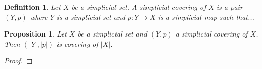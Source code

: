\documentclass{amsart}
\newtheorem{proposition}{Proposition}[section]
\newtheorem{definition}{Definition}[section]
\begin{document}
\begin{definition}
Let $X$ be a simplicial set. A simplicial covering of $X$ is a pair $(Y,p)$ where $Y$ is a simplicial set and $p\colon Y\longrightarrow X$ is a simplicial map such that...
\end{definition}

\begin{proposition}
Let $X$ be a simplicial set and $(Y,p)$ a simplicial covering of $X$. Then $(\vert Y\vert,\vert p\vert)$ is covering of $\vert X\vert$.
\end{proposition}

\begin{proof}

\end{proof}




\end{document}
